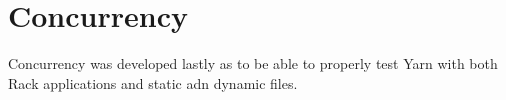 \section{Concurrency}
Concurrency was developed lastly as to be able to properly test Yarn with both
Rack applications and static adn dynamic files.


